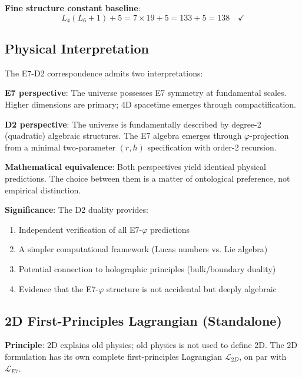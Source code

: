 \documentclass[11pt,a4paper]{article}
\begin{document}
\textbf{Fine structure constant baseline}:
\begin{equation}
L_4(L_6 + 1) + 5 = 7 \times 19 + 5 = 133 + 5 = 138 \quad \checkmark
\end{equation}

\subsection{Physical Interpretation}

The E7-D2 correspondence admits two interpretations:

\textbf{E7 perspective}: The universe possesses E7 symmetry at fundamental scales. Higher dimensions are primary; 4D spacetime emerges through compactification.

\textbf{D2 perspective}: The universe is fundamentally described by degree-2 (quadratic) algebraic structures. The E7 algebra emerges through $\varphi$-projection from a minimal two-parameter $(r, h)$ specification with order-2 recursion.

\textbf{Mathematical equivalence}: Both perspectives yield identical physical predictions. The choice between them is a matter of ontological preference, not empirical distinction.

\textbf{Significance}: The D2 duality provides:
\begin{enumerate}
\item Independent verification of all E7-$\varphi$ predictions
\item A simpler computational framework (Lucas numbers vs. Lie algebra)
\item Potential connection to holographic principles (bulk/boundary duality)
\item Evidence that the E7-$\varphi$ structure is not accidental but deeply algebraic
\end{enumerate}

\subsection{2D First-Principles Lagrangian (Standalone)}
\label{sec:2d-lagrangian}

\textbf{Principle}: 2D explains old physics; old physics is not used to define 2D. The 2D formulation has its own complete first-principles Lagrangian $\mathcal{L}_{2D}$, on par with $\mathcal{L}_{E7}$.
\end{document}
